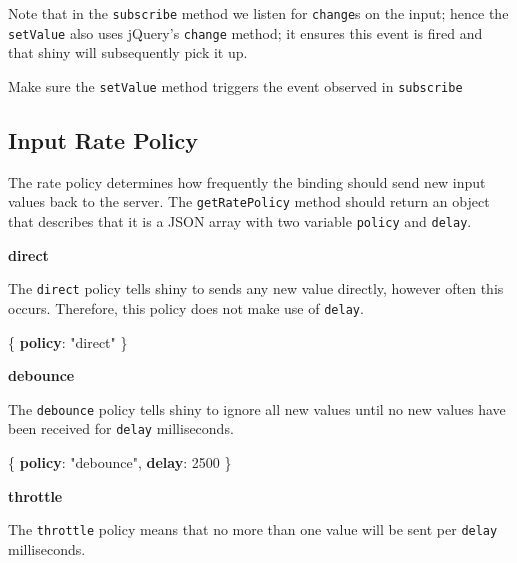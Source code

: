 \documentclass[
]{krantz}
\makeatletter
\newenvironment{Shaded}{\begin{snugshade}}{\end{snugshade}}
\newcommand{\DecValTok}[1]{\textcolor[rgb]{0.06,0.06,0.06}{#1}}
\newcommand{\ErrorTok}[1]{\textcolor[rgb]{0.14,0.14,0.14}{\textbf{#1}}}
\newcommand{\FunctionTok}[1]{\textcolor[rgb]{0,0,0}{#1}}
\newcommand{\StringTok}[1]{\textcolor[rgb]{0.5,0.5,0.5}{#1}}
\newenvironment{kframe}{%
\medskip{}
\setlength{\fboxsep}{.8em}
 \def\at@end@of@kframe{}%
 \ifinner\ifhmode%
  \def\at@end@of@kframe{\end{minipage}}%
  \begin{minipage}{\columnwidth}%
 \fi\fi%
 \def\FrameCommand##1{\hskip\@totalleftmargin \hskip-\fboxsep
 \colorbox{shadecolor}{##1}\hskip-\fboxsep
     \hskip-\linewidth \hskip-\@totalleftmargin \hskip\columnwidth}%
 \MakeFramed {\advance\hsize-\width
   \@totalleftmargin\z@ \linewidth\hsize
   \@setminipage}}%
 {\par\unskip\endMakeFramed%
 \at@end@of@kframe}
\renewenvironment{Shaded}{\begin{kframe}}{\end{kframe}}
\newenvironment{rmdblock}[1]
  {
  \begin{itemize}
  \renewcommand{\labelitemi}{
    \raisebox{-.7\height}[0pt][0pt]{
      {\setkeys{Gin}{width=3em,keepaspectratio}\texttt{[image: images/\#1]}}
    }
  }
  \setlength{\fboxsep}{1em}
  \begin{kframe}
  \item
  }
  {
  \end{kframe}
  \end{itemize}
  }
\newenvironment{rmdnote}
  {\begin{rmdblock}{note}}
  {\end{rmdblock}}
\makeatother
\begin{document}
Note that in the \texttt{subscribe} method we listen for \texttt{change}s on the input; hence the \texttt{setValue} also uses jQuery's \texttt{change} method; it ensures this event is fired and that shiny will subsequently pick it up.

\begin{rmdnote}
Make sure the \texttt{setValue} method triggers the event observed in
\texttt{subscribe}
\end{rmdnote}

\hypertarget{shiny-input-rate-policy}{%
\subsection{Input Rate Policy}\label{shiny-input-rate-policy}}

The rate policy determines how frequently the binding should send new input values back to the server. The \texttt{getRatePolicy} method should return an object that describes that it is a JSON array with two variable \texttt{policy} and \texttt{delay}.

\textbf{direct}

The \texttt{direct} policy tells shiny to sends any new value directly, however often this occurs. Therefore, this policy does not make use of \texttt{delay}.

\begin{Shaded}
\begin{Highlighting}[]
\FunctionTok{\{}
  \ErrorTok{policy}\FunctionTok{:} \StringTok{"direct"}
\FunctionTok{\}}
\end{Highlighting}
\end{Shaded}

\textbf{debounce}

The \texttt{debounce} policy tells shiny to ignore all new values until no new values have been received for \texttt{delay} milliseconds.

\begin{Shaded}
\begin{Highlighting}[]
\FunctionTok{\{}
  \ErrorTok{policy}\FunctionTok{:} \StringTok{"debounce"}\FunctionTok{,}
  \ErrorTok{delay}\FunctionTok{:} \DecValTok{2500}
\FunctionTok{\}}
\end{Highlighting}
\end{Shaded}

\textbf{throttle}

The \texttt{throttle} policy means that no more than one value will be sent per \texttt{delay} milliseconds.
\end{document}
